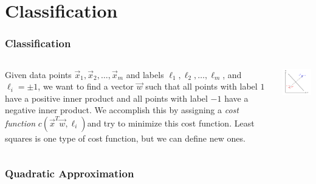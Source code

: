 \section{Classification}

\begin{frame}
    \frametitle{Classification}

    \begin{columns}
        \begin{column}{0.5\textwidth}
            Given data points \(\vec{x}_1, \vec{x}_2, \ldots, \vec{x}_m\) and labels \(\ell_1, \ell_2, \ldots, \ell_m\), and \(\ell_i = \pm 1\), we want to find a vector \(\vec{w}\) such that all points with label \(1\) have a positive inner product and all points with label \(-1\) have a negative inner product.
            We accomplish this by assigning a \emph{cost function} \(c(\vec{x}^T \vec{w}, \ell_i)\)and try to minimize this cost function.
            Least squares is one type of cost function, but we can define new ones.
        \end{column}
        \begin{column}{0.5\textwidth}
            \includegraphics[width=\textwidth]{images/classification.png}
        \end{column}
    \end{columns}
\end{frame}

\begin{frame}
    \frametitle{Quadratic Approximation}

    

\end{frame}
